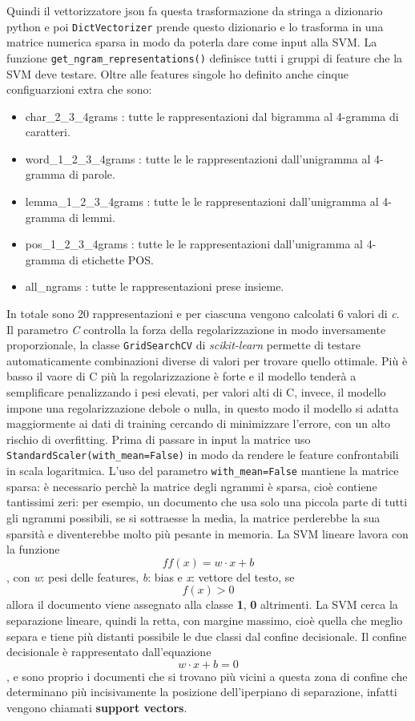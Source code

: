 \documentclass[a4paper,12pt]{report}
\begin{document}
    Quindi il vettorizzatore json fa questa trasformazione da stringa a dizionario python e poi \texttt{DictVectorizer} prende questo dizionario e lo trasforma in una matrice numerica sparsa in modo da poterla dare come input alla SVM. La funzione \texttt{get\_ngram\_representations()} definisce tutti i gruppi di feature che la SVM deve testare. Oltre alle features singole ho definito anche cinque configuarzioni extra che sono: \begin{itemize}
        \item char\_2\_3\_4grams : tutte le rappresentazioni dal bigramma al 4-gramma di caratteri.
        \item word\_1\_2\_3\_4grams  : tutte le le rappresentazioni dall'unigramma al 4-gramma di parole. 
        \item lemma\_1\_2\_3\_4grams : tutte le le rappresentazioni dall'unigramma al 4-gramma di lemmi.
        \item pos\_1\_2\_3\_4grams : tutte le le rappresentazioni dall'unigramma al 4-gramma di etichette POS.
        \item all\_ngrams : tutte le rappresentazioni prese insieme. 
    \end{itemize}
    In totale sono 20 rappresentazioni e per ciascuna vengono calcolati 6 valori di \textit{c}. Il parametro \textit{C} controlla la forza della regolarizzazione in modo inversamente proporzionale, la classe \texttt{GridSearchCV} di \textit{scikit-learn} permette di testare automaticamente combinazioni diverse di valori per trovare quello ottimale. Più è basso il vaore di C più la regolarizzazione è forte e il modello tenderà a semplificare penalizzando i pesi elevati, per valori alti di C, invece, il modello impone una regolarizzazione debole o nulla, in questo modo il modello si adatta maggiormente ai dati di training cercando di minimizzare l'errore, con un alto rischio di overfitting. 
    Prima di passare in input la matrice uso \texttt{StandardScaler(with\_mean=False)} in modo da rendere le feature confrontabili in scala logaritmica. L'uso del parametro \texttt{with\_mean=False} mantiene la matrice sparsa: è necessario perchè la matrice degli ngrammi è sparsa, cioè contiene tantissimi zeri: per esempio, un documento che usa solo una piccola parte di tutti gli ngrammi possibili, se si sottraesse la media, la matrice perderebbe la sua sparsità e diventerebbe molto più pesante in memoria. La SVM lineare lavora con la funzione $$ff(x) = w · x + b $$, con \textit{w}: pesi delle features, \textit{b}: bias e \textit{x}: vettore del testo, se $$f(x) > 0$$ allora il documento viene assegnato alla classe \textbf{1}, \textbf{0} altrimenti. La SVM cerca la separazione lineare, quindi la retta, con margine massimo, cioè quella che meglio separa e tiene più distanti possibile le due classi dal confine decisionale. Il confine decisionale è rappresentato dall'equazione $$w · x + b = 0$$, e sono proprio i documenti che si trovano più vicini a questa zona di confine che determinano più incisivamente la posizione dell'iperpiano di separazione, infatti vengono chiamati \textbf{support vectors}. 
\end{document}
